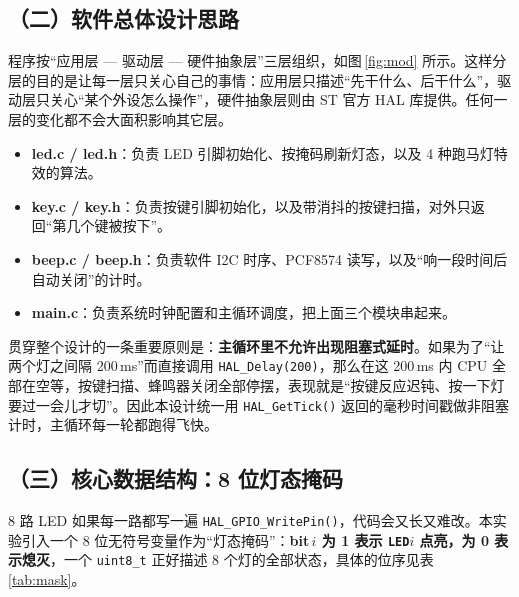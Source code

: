 \documentclass[UTF8,zihao=5,fontset=fandol]{ctexart}
\begin{document}
\begin{reportsection}{\MethodTitle}{\MethodHint}

  \subsection*{（二）软件总体设计思路}

  程序按“应用层 --- 驱动层 --- 硬件抽象层”三层组织，如图\,\ref{fig:mod} 所示。这样分层的目的是让每一层只关心自己的事情：应用层只描述“先干什么、后干什么”，驱动层只关心“某个外设怎么操作”，硬件抽象层则由 ST 官方 HAL 库提供。任何一层的变化都不会大面积影响其它层。

  \begin{itemize}
    \item \textbf{led.c / led.h}：负责 LED 引脚初始化、按掩码刷新灯态，以及 4 种跑马灯特效的算法。
    \item \textbf{key.c / key.h}：负责按键引脚初始化，以及带消抖的按键扫描，对外只返回“第几个键被按下”。
    \item \textbf{beep.c / beep.h}：负责软件 I2C 时序、PCF8574 读写，以及“响一段时间后自动关闭”的计时。
    \item \textbf{main.c}：负责系统时钟配置和主循环调度，把上面三个模块串起来。
  \end{itemize}

  贯穿整个设计的一条重要原则是：\textbf{主循环里不允许出现阻塞式延时}。如果为了“让两个灯之间隔 200\,ms”而直接调用 \texttt{HAL\_Delay(200)}，那么在这 200\,ms 内 CPU 全部在空等，按键扫描、蜂鸣器关闭全部停摆，表现就是“按键反应迟钝、按一下灯要过一会儿才切”。因此本设计统一用 \texttt{HAL\_GetTick()} 返回的毫秒时间戳做非阻塞计时，主循环每一轮都跑得飞快。


  \subsection*{（三）核心数据结构：8 位灯态掩码}

  8 路 LED 如果每一路都写一遍 \texttt{HAL\_GPIO\_WritePin()}，代码会又长又难改。本实验引入一个 8 位无符号变量作为“灯态掩码”：\textbf{bit\,$i$ 为 1 表示 \texttt{LED}$i$ 点亮，为 0 表示熄灭}，一个 \texttt{uint8\_t} 正好描述 8 个灯的全部状态，具体的位序见表\,\ref{tab:mask}。


\end{reportsection}
\end{document}
